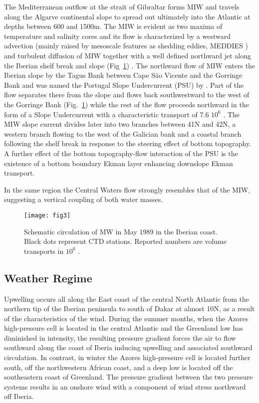 The Mediterranean outflow at the strait of Gibraltar forms MIW and
travels along the Algarve continental slope to spread out
ultimately into the Atlantic at depths between 600 and 1500m. The
MIW is evident as two maxima of temperature and salinity cores
\citep{Daniault94} and its flow is characterized by a westward
advection (mainly raised by mesoscale features as shedding eddies,
MEDDIES \citep{Kase89,Haynes90}) and turbulent diffusion of MIW
together with a well defined northward jet along the Iberian shelf
break and slope (Fig~\ref{fig:circmw}) \citep{Meincke75,Arhan94}.
The northward flow of MIW enters the Iberian slope by the Tagus
Bank between Cape S\~ao Vicente and the Gorringe Bank
\citep{Zenk90} and was named the Portugal Slope Undercurrent (PSU)
by \citet{Ambar94}. Part of the flow separates there from the
slope and flows back southwestward to the west of the Gorringe
Bank (Fig.~\ref{fig:circmw}) while the rest of the flow proceeds
northward in the form of a Slope Undercurrent \citep{Daniault94}
with a characteristic transport of 7.6 $10^6$ \tra \citep{Maze97}.
The MIW slope current divides later into two branches between
41\deg N and 42\deg N, a western branch flowing to the west of the
Galician bank and a coastal branch following the shelf break in
response to the  steering effect of bottom topography.  A further
effect of the bottom topography-flow interaction of the PSU is the
existence of a bottom boundary Ekman layer enhancing downslope
Ekman transport.

In the same region the Central Waters flow strongly resembles that
of the MIW, suggesting a vertical coupling of both water masses.
\begin{figure}
  \centering
  \texttt{[image: fig3]}
  \caption{Schematic circulation of MW in May 1989 in the Iberian
  coast. Black dots represent CTD stations. Reported numbers are volume
  transports in $10^6$ .}
  \label{fig:circmw}
\end{figure}
\subsection{Weather Regime} Upwelling occurs all along the East
coast of the central North Atlantic from the northern tip of the
Iberian peninsula to south of Dakar at almost 10\deg N, as a
result of the characteristics of the wind. During the summer
months, when the Azores high-pressure cell is located in the
central Atlantic and the Greenland low has diminished in
intensity, the resulting pressure gradient forces the air to flow
southward along the coast of Iberia inducing upwelling and
associated southward circulation. In contrast, in winter the
Azores high-pressure cell is located further south, off the
northwestern African coast, and a deep low is located off the
southeastern coast of Greenland. The pressure gradient between the
two pressure systems results in an onshore wind with a component
of wind stress northward off Iberia.

